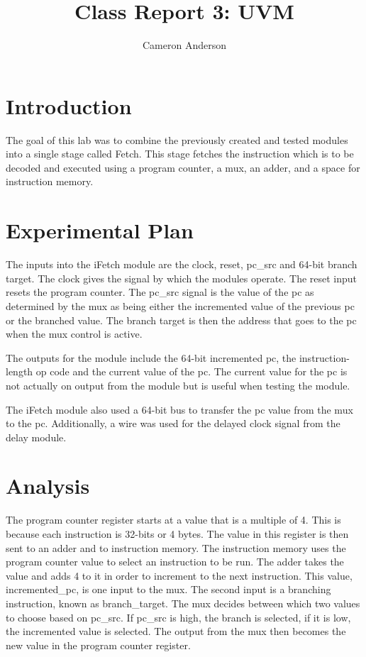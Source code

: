 \documentclass{article}
\author{Cameron Anderson}
\title{Class Report 3: UVM}
\begin{document}
\maketitle

\section{Introduction}
The goal of this lab was to combine the previously created and tested modules into a single stage called Fetch. This stage fetches the instruction which is to be decoded and executed using a program counter, a mux, an adder, and a space for instruction memory.

\section{Experimental Plan}
The inputs into the iFetch module are the clock, reset, pc\_src and 64-bit branch target. The clock gives the signal by which the modules operate. The reset input resets the program counter. The pc\_src signal is the value of the pc as determined by the mux as being either the incremented value of the previous pc or the branched value.  The branch target is then the address that goes to the pc when the mux control is active.
     
The outputs for the module include the 64-bit incremented pc, the instruction-length op code and the current value of the pc. The current value for the pc is not actually on output from the module but is useful when testing the module. 

The iFetch module also used a 64-bit bus to transfer the pc value from the mux to the pc. Additionally, a wire was used for the delayed clock signal from the delay module.

\section{Analysis}
The program counter register starts at a value that is a multiple of 4. This is because each instruction is 32-bits or 4 bytes. The value in this register is then sent to an adder and to instruction memory. The instruction memory uses the program counter value to select an instruction to be run. The adder takes the value and adds 4 to it in order to increment to the next instruction. This value, incremented\_pc, is one input to the mux. The second input is a branching instruction, known as branch\_target. The mux decides between which two values to choose based on pc\_src. If pc\_src is high, the branch is selected, if it is low, the incremented value is selected. The output from the mux then becomes the new value in the program counter register. 
\end{document}
